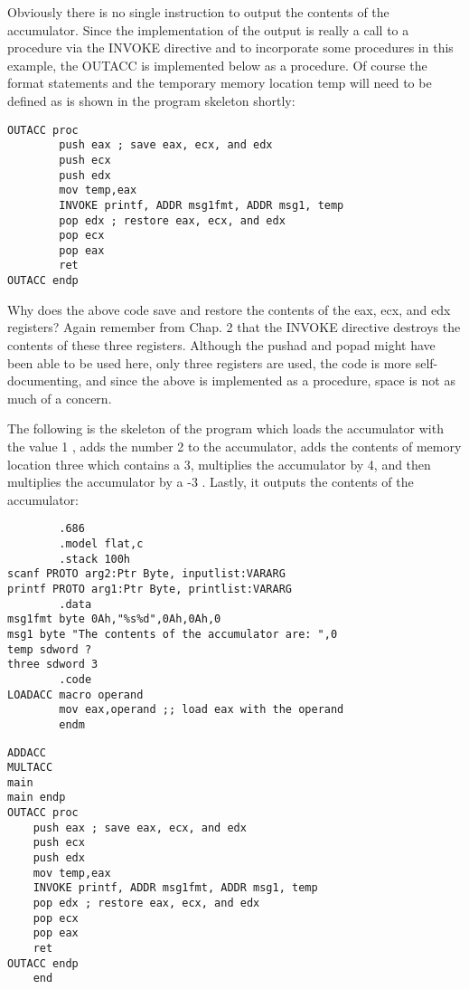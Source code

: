 \documentclass[10pt]{article}
\begin{document}
Obviously there is no single instruction to output the contents of the accumulator. Since the implementation of the output is really a call to a procedure via the INVOKE directive and to incorporate some procedures in this example, the OUTACC is implemented below as a procedure. Of course the format statements and the temporary memory location temp will need to be defined as is shown in the program skeleton shortly:

\begin{verbatim}
OUTACC proc
        push eax ; save eax, ecx, and edx
        push ecx
        push edx
        mov temp,eax
        INVOKE printf, ADDR msg1fmt, ADDR msg1, temp
        pop edx ; restore eax, ecx, and edx
        pop ecx
        pop eax
        ret
OUTACC endp
\end{verbatim}

Why does the above code save and restore the contents of the eax, ecx, and edx registers? Again remember from Chap. 2 that the INVOKE directive destroys the contents of these three registers. Although the pushad and popad might have been able to be used here, only three registers are used, the code is more self-documenting, and since the above is implemented as a procedure, space is not as much of a concern.

The following is the skeleton of the program which loads the accumulator with the value 1 , adds the number 2 to the accumulator, adds the contents of memory location three which contains a 3, multiplies the accumulator by 4, and then multiplies the accumulator by a -3 . Lastly, it outputs the contents of the accumulator:

\begin{verbatim}
        .686
        .model flat,c
        .stack 100h
scanf PROTO arg2:Ptr Byte, inputlist:VARARG
printf PROTO arg1:Ptr Byte, printlist:VARARG
        .data
msg1fmt byte 0Ah,"%s%d",0Ah,0Ah,0
msg1 byte "The contents of the accumulator are: ",0
temp sdword ?
three sdword 3
        .code
LOADACC macro operand
        mov eax,operand ;; load eax with the operand
        endm
\end{verbatim}

\begin{verbatim}
ADDACC
MULTACC
main
main endp
OUTACC proc
    push eax ; save eax, ecx, and edx
    push ecx
    push edx
    mov temp,eax
    INVOKE printf, ADDR msg1fmt, ADDR msg1, temp
    pop edx ; restore eax, ecx, and edx
    pop ecx
    pop eax
    ret
OUTACC endp
    end
\end{verbatim}
\end{document}
